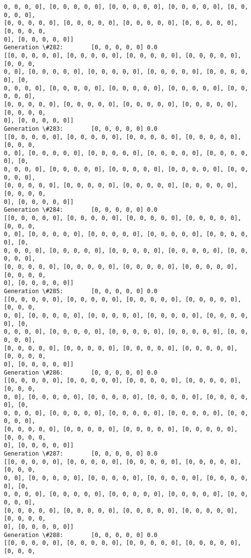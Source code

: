 \documentclass[11pt]{article}
\begin{document}
\begin{Verbatim}[commandchars=\\\{\}]
0, 0, 0, 0], [0, 0, 0, 0, 0], [0, 0, 0, 0, 0], [0, 0, 0, 0, 0], [0, 0, 0, 0, 0],
[0, 0, 0, 0, 0], [0, 0, 0, 0, 0], [0, 0, 0, 0, 0], [0, 0, 0, 0, 0], [0, 0, 0, 0,
0], [0, 0, 0, 0, 0]]
Generation \#282:        [0, 0, 0, 0, 0] 0.0
[[0, 0, 0, 0, 0], [0, 0, 0, 0, 0], [0, 0, 0, 0, 0], [0, 0, 0, 0, 0], [0, 0, 0,
0, 0], [0, 0, 0, 0, 0], [0, 0, 0, 0, 0], [0, 0, 0, 0, 0], [0, 0, 0, 0, 0], [0,
0, 0, 0, 0], [0, 0, 0, 0, 0], [0, 0, 0, 0, 0], [0, 0, 0, 0, 0], [0, 0, 0, 0, 0],
[0, 0, 0, 0, 0], [0, 0, 0, 0, 0], [0, 0, 0, 0, 0], [0, 0, 0, 0, 0], [0, 0, 0, 0,
0], [0, 0, 0, 0, 0]]
Generation \#283:        [0, 0, 0, 0, 0] 0.0
[[0, 0, 0, 0, 0], [0, 0, 0, 0, 0], [0, 0, 0, 0, 0], [0, 0, 0, 0, 0], [0, 0, 0,
0, 0], [0, 0, 0, 0, 0], [0, 0, 0, 0, 0], [0, 0, 0, 0, 0], [0, 0, 0, 0, 0], [0,
0, 0, 0, 0], [0, 0, 0, 0, 0], [0, 0, 0, 0, 0], [0, 0, 0, 0, 0], [0, 0, 0, 0, 0],
[0, 0, 0, 0, 0], [0, 0, 0, 0, 0], [0, 0, 0, 0, 0], [0, 0, 0, 0, 0], [0, 0, 0, 0,
0], [0, 0, 0, 0, 0]]
Generation \#284:        [0, 0, 0, 0, 0] 0.0
[[0, 0, 0, 0, 0], [0, 0, 0, 0, 0], [0, 0, 0, 0, 0], [0, 0, 0, 0, 0], [0, 0, 0,
0, 0], [0, 0, 0, 0, 0], [0, 0, 0, 0, 0], [0, 0, 0, 0, 0], [0, 0, 0, 0, 0], [0,
0, 0, 0, 0], [0, 0, 0, 0, 0], [0, 0, 0, 0, 0], [0, 0, 0, 0, 0], [0, 0, 0, 0, 0],
[0, 0, 0, 0, 0], [0, 0, 0, 0, 0], [0, 0, 0, 0, 0], [0, 0, 0, 0, 0], [0, 0, 0, 0,
0], [0, 0, 0, 0, 0]]
Generation \#285:        [0, 0, 0, 0, 0] 0.0
[[0, 0, 0, 0, 0], [0, 0, 0, 0, 0], [0, 0, 0, 0, 0], [0, 0, 0, 0, 0], [0, 0, 0,
0, 0], [0, 0, 0, 0, 0], [0, 0, 0, 0, 0], [0, 0, 0, 0, 0], [0, 0, 0, 0, 0], [0,
0, 0, 0, 0], [0, 0, 0, 0, 0], [0, 0, 0, 0, 0], [0, 0, 0, 0, 0], [0, 0, 0, 0, 0],
[0, 0, 0, 0, 0], [0, 0, 0, 0, 0], [0, 0, 0, 0, 0], [0, 0, 0, 0, 0], [0, 0, 0, 0,
0], [0, 0, 0, 0, 0]]
Generation \#286:        [0, 0, 0, 0, 0] 0.0
[[0, 0, 0, 0, 0], [0, 0, 0, 0, 0], [0, 0, 0, 0, 0], [0, 0, 0, 0, 0], [0, 0, 0,
0, 0], [0, 0, 0, 0, 0], [0, 0, 0, 0, 0], [0, 0, 0, 0, 0], [0, 0, 0, 0, 0], [0,
0, 0, 0, 0], [0, 0, 0, 0, 0], [0, 0, 0, 0, 0], [0, 0, 0, 0, 0], [0, 0, 0, 0, 0],
[0, 0, 0, 0, 0], [0, 0, 0, 0, 0], [0, 0, 0, 0, 0], [0, 0, 0, 0, 0], [0, 0, 0, 0,
0], [0, 0, 0, 0, 0]]
Generation \#287:        [0, 0, 0, 0, 0] 0.0
[[0, 0, 0, 0, 0], [0, 0, 0, 0, 0], [0, 0, 0, 0, 0], [0, 0, 0, 0, 0], [0, 0, 0,
0, 0], [0, 0, 0, 0, 0], [0, 0, 0, 0, 0], [0, 0, 0, 0, 0], [0, 0, 0, 0, 0], [0,
0, 0, 0, 0], [0, 0, 0, 0, 0], [0, 0, 0, 0, 0], [0, 0, 0, 0, 0], [0, 0, 0, 0, 0],
[0, 0, 0, 0, 0], [0, 0, 0, 0, 0], [0, 0, 0, 0, 0], [0, 0, 0, 0, 0], [0, 0, 0, 0,
0], [0, 0, 0, 0, 0]]
Generation \#288:        [0, 0, 0, 0, 0] 0.0
[[0, 0, 0, 0, 0], [0, 0, 0, 0, 0], [0, 0, 0, 0, 0], [0, 0, 0, 0, 0], [0, 0, 0,

\end{Verbatim}
\end{document}
